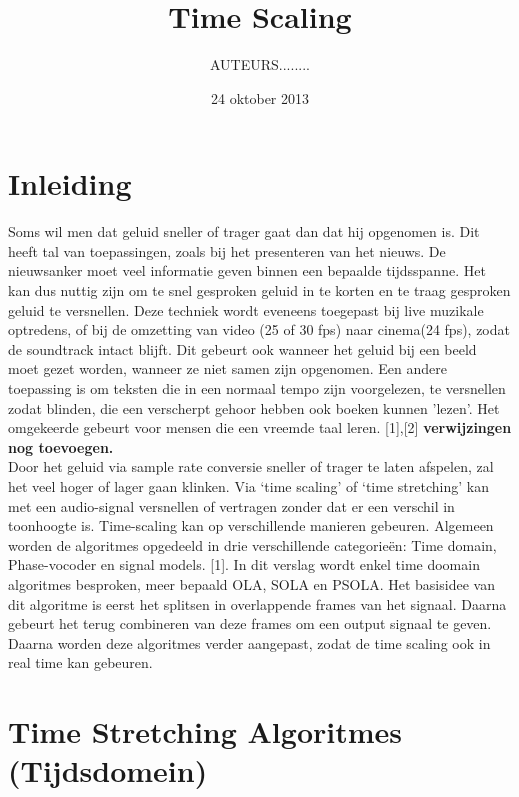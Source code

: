 \documentclass[12pt]{report}
\begin{document}
\title{{\Huge \textbf{Time Scaling}}}
\date{24 oktober 2013}
\author{AUTEURS........}
\maketitle

\tableofcontents

\chapter{Inleiding}
Soms wil men dat geluid sneller of trager gaat dan dat hij opgenomen is. Dit heeft tal van toepassingen, zoals bij het presenteren van het nieuws. De nieuwsanker moet veel informatie geven binnen een bepaalde tijdsspanne. Het kan dus nuttig zijn om te snel gesproken geluid in te korten en te traag gesproken geluid te versnellen. Deze techniek wordt eveneens toegepast bij live muzikale optredens, of bij de omzetting van video (25 of 30 fps) naar cinema(24 fps), zodat de soundtrack intact blijft. Dit gebeurt ook wanneer het geluid bij een beeld moet gezet worden, wanneer ze niet samen zijn opgenomen. Een andere toepassing is om teksten die in een normaal tempo zijn voorgelezen, te versnellen zodat blinden, die een verscherpt gehoor hebben ook boeken kunnen 'lezen'. Het omgekeerde gebeurt voor mensen die een vreemde taal leren. [1],[2]
\textbf{verwijzingen nog toevoegen.}\\

Door het geluid via sample rate conversie sneller of trager te laten afspelen, zal het veel hoger of lager gaan klinken. Via ‘time scaling’ of ‘time stretching’ kan met een audio-signal versnellen of vertragen zonder dat er een verschil in toonhoogte is. Time-scaling kan op verschillende manieren gebeuren. Algemeen worden de algoritmes opgedeeld in drie verschillende categorieën: Time domain, Phase-vocoder en signal models. [1]. In dit verslag wordt enkel time doomain algoritmes besproken, meer bepaald OLA, SOLA en PSOLA. Het basisidee  van dit algoritme is eerst het splitsen in overlappende frames van het signaal. Daarna gebeurt het terug combineren van deze frames om een output signaal te geven. Daarna worden deze algoritmes verder aangepast, zodat de time scaling ook in real time kan gebeuren. 

\chapter{Time Stretching Algoritmes (Tijdsdomein)}
\end{document}
